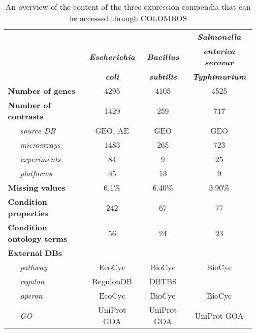 \begin{table}
	\caption{An overview of the content of the three expression compendia that can be accessed through COLOMBOS}
	\label{tab:colTB-overview}
	\begin{small}
	\begin{tabular}{@{}l c c c@{}}
	\toprule
	& & & {\bf\it\small Salmonella} \\
	& {\bf\it\small Escherichia} & {\bf\it\small Bacillus} & {\bf\it\small enterica serovar} \\
	& {\bf\it\small coli} & {\bf\it\small subtilis} & {\bf\it\small  Typhimurium} \\
	\midrule
	{\bf Number of genes} 		& 4295 & 4105 & 4525 \\
	{\bf Number of contrasts} 	& 1429 & 259 & 717 \\
	{\it ~~~source DB} 			& GEO, AE & GEO & GEO \\
	{\it ~~~microarrays} 		& 1483 & 265 & 723 \\
	{\it ~~~experiments}	 	& 84 & 9 & 25 \\
	{\it ~~~platforms} 			& 35 & 13 & 9 \\
	{\bf Missing values} 		& 6.1\% & 6.40\% & 3.90\% \\
	{\bf Condition properties} 	& 242 & 67 & 77 \\
	{\bf Condition ontology terms} & 56 & 24 & 23 \\
	\multicolumn{4}{l}{\bf External DBs} \\
	{\it ~~~pathway} 			& EcoCyc & BioCyc & BioCyc \\
	{\it ~~~regulon} 			& RegulonDB & DBTBS & \\
	{\it ~~~operon} 			& EcoCyc & BioCyc & BioCyc \\
	{\it ~~~GO} 				& UniProt GOA & UniProt GOA & UniProt GOA \\
	\bottomrule
	\end{tabular}
	\end{small}
\end{table}



